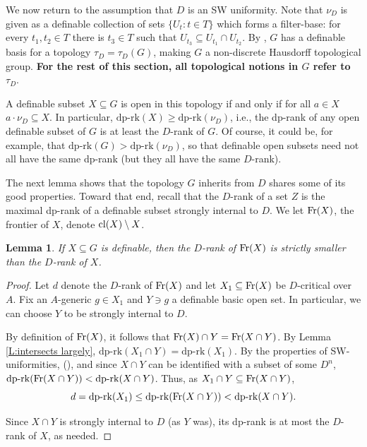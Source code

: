 \documentclass[11pt]{amsart}
\newtheorem{lemma}[theorem]{Lemma}
\theoremstyle{definition}
\newcommand{\0}{\emptyset}
\def\dpr{\mathrm{dp\text{-}rk}}
\def\sub{\subseteq}
\begin{document}
We now return to the assumption that $D$ is an SW uniformity. Note that $\nu_D$ is given as a definable collection of sets $\{U_t:t\in T\}$ which forms a filter-base: for every $t_1,t_2\in T$ there is $t_3\in T$ such that  $U_{t_3}\sub U_{t_1}\cap U_{t_2}$.
By \cite[Corollary 5.14]{HaHaPeGps}, $G$ has a definable basis for a topology $\tau_D=\tau_{D}(G)$,  making $G$ a non-discrete Hausdorff topological group. {\bf For the rest of this section, all topological notions in $G$  refer to $\tau_D$}. 

A definable subset $X\subseteq G$ is open in this topology if and only if for all $a\in X$  $a\cdot \nu_D\sub X$. In particular, $\dpr(X)\ge \dpr(\nu_D)$, i.e., the dp-rank of any open definable subset of $G$ is at least the $D$-rank of $G$. Of course, it could be, for example, that $\dpr(G)>\dpr(\nu_D)$, so that definable open subsets need not all have the same dp-rank (but they all have the same $D$-rank). 

The next lemma shows that the topology $G$ inherits from $D$ shares some of its good properties. Toward that end,  recall that the $D$-rank of a set $Z$ is the maximal dp-rank of a definable subset strongly internal to $D$. We let $\operatorname{Fr}(X)$, the frontier of $X$, denote   $\operatorname{cl}(X)\setminus X$.

\begin{lemma}\label{frontier}
If $X\subseteq G$ is definable, then the $D$-rank of $\operatorname{Fr}(X)$ is strictly smaller than the $D$-rank of $X$.
\end{lemma}
\begin{proof} 
Let $d$ denote  the $D$-rank of $\operatorname{Fr}(X)$ and let $X_1\subseteq \operatorname{Fr}(X)$ be $D$-critical over $A$.  Fix an $A$-generic $g\in X_1$  and $Y\ni g$ a definable basic open set. In particular, we can choose $Y$ to be strongly internal to $D$.

By definition of $\operatorname{Fr}(X)$, it follows that  $\operatorname{Fr}(X)\cap Y= \operatorname{Fr}(X\cap Y)$. By Lemma \ref{L:intersects largely}, $\dpr(X_1\cap Y)=\dpr(X_1)$. By the properties of SW-uniformities, (\cite[Proposition 4.3, Lemma 2.3]{SimWal}), and since $X\cap Y$ can be identified with a subset of some $D^n$, $\dpr(\fr(X\cap Y))<\dpr(X\cap Y)$. Thus, as $X_1\cap Y\subseteq \operatorname{Fr}(X\cap Y)$,
\[d=\dpr(X_1)\leq \dpr(\fr(X\cap Y))<\dpr(X\cap Y).\]

Since $X\cap Y$ is strongly internal to $D$ (as $Y$ was), its dp-rank is at most the $D$-rank of $X$, as needed.
\end{proof}
\end{document}
